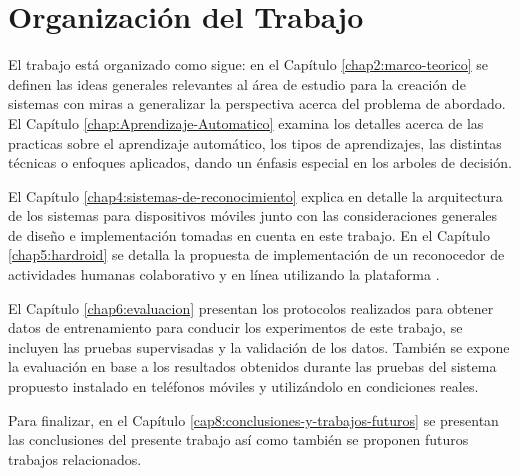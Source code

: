 \section{Organización del Trabajo}

\label{sec14:organizaciuxf3n-del-trabajo}El trabajo está organizado
como sigue: en el Capítulo \ref{chap2:marco-teorico} se definen las
ideas generales relevantes al área de estudio para la creación de
sistemas  con miras a generalizar la perspectiva acerca
del problema de abordado. El Capítulo \ref{chap:Aprendizaje-Automatico}
examina los detalles acerca de las practicas sobre el aprendizaje
automático, los tipos de aprendizajes, las distintas técnicas o enfoques
aplicados, dando un énfasis especial en los arboles de decisión. 

El Capítulo \ref{chap4:sistemas-de-reconocimiento} explica en detalle
la arquitectura de los sistemas  para dispositivos móviles
junto con las consideraciones generales de diseño e implementación
tomadas en cuenta en este trabajo. En el Capítulo \ref{chap5:hardroid}
se detalla la propuesta de implementación de un reconocedor de actividades
humanas colaborativo y en línea utilizando la plataforma \emph{}.

El Capítulo \ref{chap6:evaluacion} presentan los protocolos realizados
para obtener datos de entrenamiento para conducir los experimentos
de este trabajo, se incluyen las pruebas supervisadas y la validación
de los datos. También se expone la evaluación en base a los resultados
obtenidos durante las pruebas del sistema  propuesto instalado
en teléfonos móviles y utilizándolo en condiciones reales. 

Para finalizar, en el Capítulo \ref{cap8:conclusiones-y-trabajos-futuros}
se presentan las conclusiones del presente trabajo así como también
se proponen futuros trabajos relacionados. 
